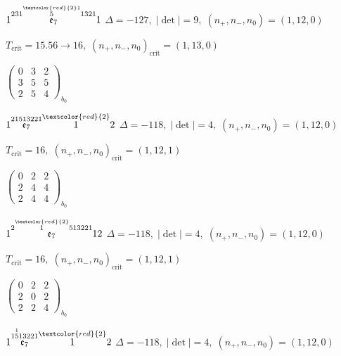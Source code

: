 \documentclass[10pt]{article}
\begin{document}
\smallskip

$1\overset{231\overset{\textcolor{red}{2}1}{5}1321}{\mathfrak{e}_7}1$ \quad $\Delta=-127,\; |\det|=9,\; (n_+,n_-,n_0)=(1,12,0)$

\hspace{1em}$T_{\text{crit}}=15.56 \to 16,\; (n_+,n_-,n_0)_{\text{crit}}=(1,13,0)$

\hspace{2em}$\left(\begin{smallmatrix}0 & 3 & 2 \\ 3 & 5 & 5 \\ 2 & 5 & 4\end{smallmatrix}\right)_{\!b_0}$

\smallskip

$1\overset{21513221}{\mathfrak{e}_7}\overset{\textcolor{red}{2}}{1}2$ \quad $\Delta=-118,\; |\det|=4,\; (n_+,n_-,n_0)=(1,12,0)$

\hspace{1em}$T_{\text{crit}}=16,\; (n_+,n_-,n_0)_{\text{crit}}=(1,12,1)$

\hspace{2em}$\left(\begin{smallmatrix}0 & 2 & 2 \\ 2 & 4 & 4 \\ 2 & 4 & 4\end{smallmatrix}\right)_{\!b_0}$

$1\overset{2\overset{\textcolor{red}{2}}{1}513221}{\mathfrak{e}_7}12$ \quad $\Delta=-118,\; |\det|=4,\; (n_+,n_-,n_0)=(1,12,0)$

\hspace{1em}$T_{\text{crit}}=16,\; (n_+,n_-,n_0)_{\text{crit}}=(1,12,1)$

\hspace{2em}$\left(\begin{smallmatrix}0 & 2 & 2 \\ 2 & 0 & 2 \\ 2 & 2 & 4\end{smallmatrix}\right)_{\!b_0}$

\smallskip

$1\overset{1\overset{1}{5}13221}{\mathfrak{e}_7}\overset{\textcolor{red}{2}}{1}2$ \quad $\Delta=-118,\; |\det|=4,\; (n_+,n_-,n_0)=(1,12,0)$
\end{document}
